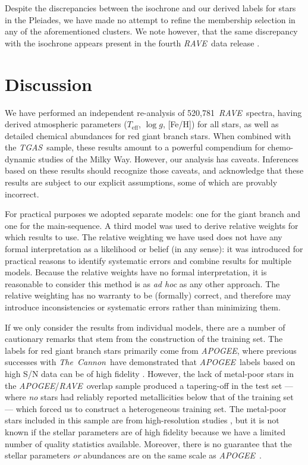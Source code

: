 \documentclass[preprint]{aastex}
\newcommand{\acronym}[1]{{\small{#1}}}
\newcommand{\project}[1]{\textsl{#1}}
\newcommand{\thecannon}{\project{The~Cannon}}
\newcommand{\rave}{\project{\acronym{RAVE}}}
\newcommand{\apogee}{\project{\acronym{APOGEE}}}
\newcommand{\tgas}{\project{\acronym{TGAS}}}
\newcommand{\teff}{T_{\mathrm{eff}}}
\newcommand{\logg}{\log g}
\newcommand{\Nspectra}{520,781}
\begin{document}
Despite the discrepancies between the isochrone and our derived labels for stars
in the Pleiades, we have made no attempt to refine the membership selection in
any of the aforementioned clusters.  We note however, that the same discrepancy
with the isochrone appears present in the fourth \rave\ data release \citet{Kordopatis_2013}.



\section{Discussion}
\label{sec:discussion}


We have performed an independent re-analysis of \Nspectra\ \rave\ spectra,
having derived atmospheric parameters ($\teff$, $\logg$, [Fe/H]) for all stars,
as well as detailed chemical abundances for red giant branch stars.  When 
combined with the \tgas\ sample, these results amount to a powerful compendium 
for chemo-dynamic studies of the Milky Way.  However, our analysis has caveats.
Inferences based on these results should recognize those caveats, and acknowledge 
that these results are subject to our explicit assumptions, some of which are provably
incorrect.


For practical purposes we adopted separate models: one for the giant branch and one
for the main-sequence.  A third model was used to derive relative weights for which
results to use.  The relative weighting we have used does not have any formal
interpretation as a likelihood or belief (in any sense): it was introduced for
practical reasons to identify systematic errors and combine results for multiple
models.  Because the relative weights have no formal interpretation, it is reasonable
to consider this method is as \emph{ad hoc} as any other approach.  The relative 
weighting has no warranty to be (formally) correct, and therefore may introduce 
inconsistencies or systematic errors rather than minimizing them.  


If we only consider the results from individual models, there are a number of cautionary
remarks that stem from the construction of the training set.  The labels for red giant 
branch stars primarily come from \apogee, where previous successes with \thecannon\
have demonstrated that \apogee\ labels based on high S/N data can be of high fidelity
\citep{Ness_2015,Ness_2016,Ho_2016,Casey_2016b}.
However, the lack of metal-poor stars in the \apogee/\rave\ overlap sample produced
a tapering-off in the test set --- where \emph{no} stars had reliably reported metallicities
below that of the training set --- which forced us to construct a heterogeneous training
set.  The metal-poor stars included in this sample are from high-resolution studies
\citep{Fulbright_2010,Ruchti_2011}, but it is not known if the stellar parameters are
of high fidelity because we have a limited number of quality statistics available. 
Moreover, there is no guarantee that the stellar parameters \emph{or} abundances are 
on the same scale as \apogee\ \citep[and good reasons to believe they will not be; see][]{Smiljanic_2014}.
\end{document}

